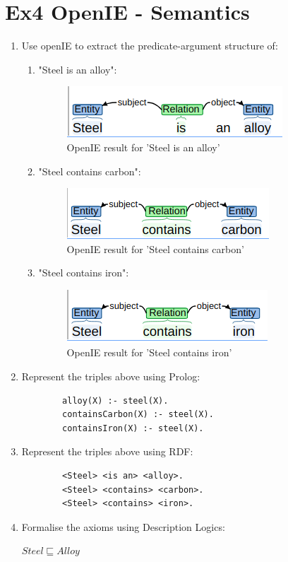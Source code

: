 \documentclass[12pt]{article}
\begin{document}
{\begin{enumerate}[1.]
\end{enumerate}

\newpage
\section{Ex4 OpenIE - Semantics}
\label{sec: ex4}
\begin{enumerate}[1.]
	\item Use openIE to extract the predicate-argument structure of:
	\begin{enumerate}[(1)]
		\item "Steel is an alloy":
		\begin{figure}[ht]
			\centering
			\includegraphics[scale=0.45]{figs/Openie1.png}
			\caption{OpenIE result for 'Steel is an alloy'}
			\label{fig:label2}
		\end{figure}
		\item "Steel contains carbon":
		\begin{figure}[ht]
			\centering
			\includegraphics[scale=0.45]{figs/Openie2.png}
			\caption{OpenIE result for 'Steel contains carbon'}
			\label{fig:label3}
		\end{figure}
		\item "Steel contains iron":
		\begin{figure}[ht]
			\centering
			\includegraphics[scale=0.45]{figs/Openie3.png}
			\caption{OpenIE result for 'Steel contains iron'}
			\label{fig:label4}
		\end{figure}
	\end{enumerate}
	\item Represent the triples above using Prolog:
	\begin{lstlisting}
		alloy(X) :- steel(X).
		containsCarbon(X) :- steel(X).
		containsIron(X) :- steel(X).
	\end{lstlisting}
	\item Represent the triples above using RDF:
	\begin{lstlisting}
		<Steel> <is an> <alloy>.
		<Steel> <contains> <carbon>.
		<Steel> <contains> <iron>.
	\end{lstlisting}
	\item Formalise the axioms using Description Logics:
	\begin{center}
	$Steel \sqsubseteq Alloy$


\end{center}
\end{enumerate}}
\end{document}
